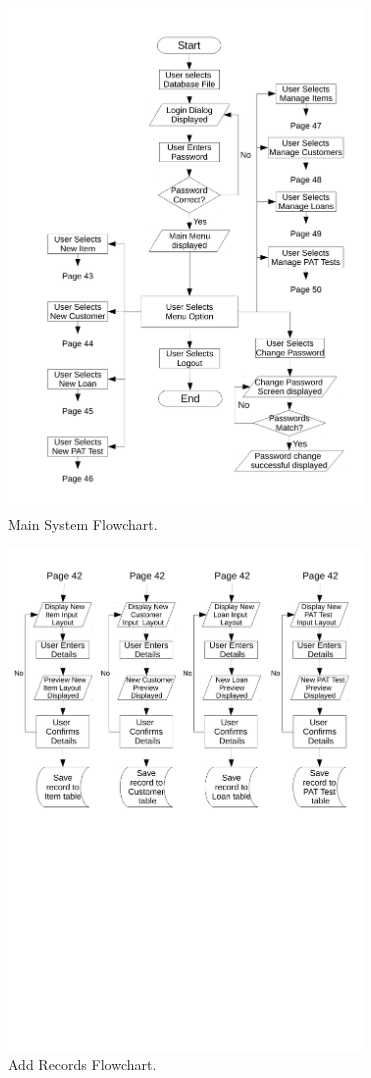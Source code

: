 \begin{figure}[H]
    \begin{center}
        \includegraphics[width=355px]{./Design/system_flowcharts/PDFs/main_system_flowchart.pdf}
    \end{center}
    \caption{Main System Flowchart.} \label{fig:print_function_result}
\end{figure}

\begin{figure}[H]
    \begin{center}
        \includegraphics[width=355px]{./Design/system_flowcharts/PDFs/add_records_flowchart.pdf}
    \end{center}
    \caption{Add Records Flowchart.} \label{fig:print_function_result}
\end{figure}

